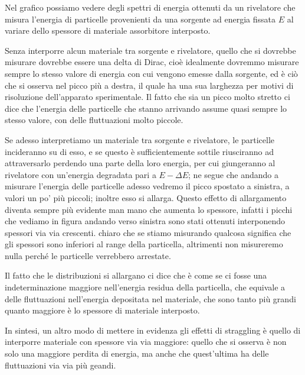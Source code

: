 Nel grafico possiamo vedere degli spettri di energia ottenuti da un rivelatore che misura l'energia di particelle provenienti da una sorgente ad energia fissata $E$ al variare dello spessore di materiale assorbitore interposto.

Senza interporre alcun materiale tra sorgente e rivelatore, quello che si dovrebbe misurare dovrebbe essere una delta di Dirac, cioè idealmente dovremmo misurare sempre lo stesso valore di energia con cui vengono emesse dalla sorgente, ed è ciò che si osserva nel picco più a destra, il quale ha una sua larghezza per motivi di risoluzione dell'apparato sperimentale. Il fatto che sia un picco molto stretto ci dice che l'energia delle particelle che stanno arrivando assume quasi sempre lo stesso valore, con delle fluttuazioni molto piccole.

Se adesso interpretiamo un materiale tra sorgente e rivelatore, le particelle incideranno su di esso, e se questo è sufficientemente sottile riusciranno ad attraversarlo perdendo una parte della loro energia, per cui giungeranno al rivelatore con un'energia degradata pari a $E - \Delta E$; ne segue che andando a misurare l'energia delle particelle adesso vedremo il picco spostato a sinistra, a valori un po' più piccoli; inoltre esso si allarga. Questo effetto di allargamento diventa sempre più evidente man mano che aumenta lo spessore, infatti i picchi che vediamo in figura andando verso sinistra sono stati ottenuti interponendo spessori via via crescenti. \E chiaro che se stiamo misurando qualcosa significa che gli spessori sono inferiori al range della particella, altrimenti non misureremo nulla perché le particelle verrebbero arrestate.

Il fatto che le distribuzioni si allargano ci dice che è come se ci fosse una indeterminazione maggiore nell'energia residua della particella, che equivale a delle fluttuazioni nell'energia depositata nel materiale, che sono tanto più grandi quanto maggiore è lo spessore di materiale interposto. 

In sintesi, un altro modo di mettere in evidenza gli effetti di straggling è quello di interporre materiale con spessore via via maggiore: quello che si osserva è non solo una maggiore perdita di energia, ma anche che quest'ultima ha delle fluttuazioni via via più geandi.


